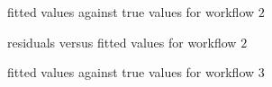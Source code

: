 \documentclass{article}
\begin{document}
\begin{figure}[!htbp]
\centering
{}
\caption{fitted values against true values for workflow $2$} \label{1d_21}
\end{figure}

\begin{figure}[!htbp]
\centering
{}
\caption{residuals versus fitted values for workflow $2$} \label{1d_22}
\end{figure}

\begin{figure}[!htbp]
\centering
{}
\caption{fitted values against true values for workflow $3$} \label{1d_31}
\end{figure}
\end{document}

